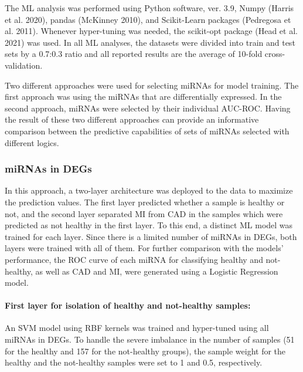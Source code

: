\documentclass[smallextended]{svjour3}       %
\begin{document}
The ML analysis was performed using Python software, ver. 3.9, Numpy
(Harris et al. 2020), pandas (McKinney 2010), and Scikit-Learn packages
(Pedregosa et al. 2011). Whenever hyper-tuning was needed, the
scikit-opt package (Head et al. 2021) was used. In all ML analyses, the
datasets were divided into train and test sets by a 0.7:0.3 ratio and
all reported results are the average of 10-fold cross-validation.

Two different approaches were used for selecting miRNAs for model
training. The first approach was using the miRNAs that are
differentially expressed. In the second approach, miRNAs were selected
by their individual AUC-ROC. Having the result of these two different
approaches can provide an informative comparison between the predictive
capabilities of sets of miRNAs selected with different logics.

\hypertarget{mirnas-in-degs}{%
\subsubsection{miRNAs in DEGs}\label{mirnas-in-degs}}

In this approach, a two-layer architecture was deployed to the data to
maximize the prediction values. The first layer predicted whether a
sample is healthy or not, and the second layer separated MI from CAD in
the samples which were predicted as not healthy in the first layer. To
this end, a distinct ML model was trained for each layer. Since there is
a limited number of miRNAs in DEGs, both layers were trained with all of
them. For further comparison with the models' performance, the ROC curve
of each miRNA for classifying healthy and not-healthy, as well as CAD
and MI, were generated using a Logistic Regression model.

\hypertarget{first-layer-for-isolation-of-healthy-and-not-healthy-samples}{%
\paragraph{First layer for isolation of healthy and not-healthy
samples:}\label{first-layer-for-isolation-of-healthy-and-not-healthy-samples}}

An SVM model using RBF kernels was trained and hyper-tuned using all
miRNAs in DEGs. To handle the severe imbalance in the number of samples
(51 for the healthy and 157 for the not-healthy groups), the sample
weight for the healthy and the not-healthy samples were set to 1 and
0.5, respectively.
\end{document}
